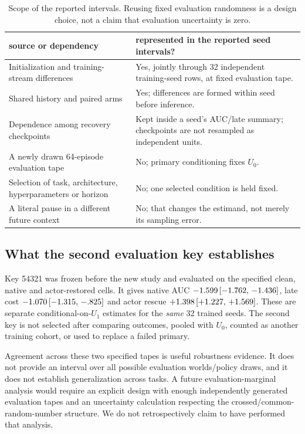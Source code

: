 \begin{table}[ht]
\centering
\caption{Scope of the reported intervals. Reusing fixed evaluation randomness is a design choice, not a claim that evaluation uncertainty is zero.}
\label{m:uncertaintyscope}
\small
\begin{tabularx}{\linewidth}{@{}>{\raggedright\arraybackslash}p{5.2cm}X@{}}
\toprule
source or dependency & represented in the reported seed intervals? \\
\midrule
Initialization and training-stream differences & Yes, jointly through 32 independent training-seed rows, at fixed evaluation tape. \\
Shared history and paired arms & Yes; differences are formed within seed before inference. \\
Dependence among recovery checkpoints & Kept inside a seed's AUC/late summary; checkpoints are not resampled as independent units. \\
A newly drawn 64-episode evaluation tape & No; primary conditioning fixes $U_0$. \\
Selection of task, architecture, hyperparameters or horizon & No; one selected condition is held fixed. \\
A literal pause in a different future context & No; that changes the estimand, not merely its sampling error. \\
\bottomrule
\end{tabularx}
\end{table}

\subsection{What the second evaluation key establishes}
Key 54321 was frozen before the new study and evaluated on the specified clean, native and actor-restored cells. It gives native AUC $-1.599\,[-1.762,\,-1.436]$, late cost $-1.070\,[-1.315,\,-.825]$ and actor rescue $+1.398\,[+1.227,\,+1.569]$. These are separate conditional-on-$U_1$ estimates for the \emph{same} 32 trained seeds. The second key is not selected after comparing outcomes, pooled with $U_0$, counted as another training cohort, or used to replace a failed primary.

Agreement across these two specified tapes is useful robustness evidence. It does not provide an interval over all possible evaluation worlds/policy draws, and it does not establish generalization across tasks. A future evaluation-marginal analysis would require an explicit design with enough independently generated evaluation tapes and an uncertainty calculation respecting the crossed/common-random-number structure. We do not retrospectively claim to have performed that analysis.

